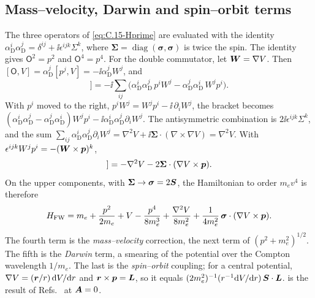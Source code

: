 \subsection{Mass--velocity, Darwin and spin--orbit terms}

The three operators of \cref{eq:C.15-Hprime} are evaluated with the identity $\alpha_{\mathrm{D}}^i\alpha_{\mathrm{D}}^j = \delta^{ij} + \ii\epsilon^{ijk}\Sigma^k$, where $\boldsymbol{\Sigma} = \operatorname{diag}(\boldsymbol{\sigma}, \boldsymbol{\sigma})$ is twice the spin. The identity gives $\mathsf{O}^2 = p^2$ and $\mathsf{O}^4 = p^4$. For the double commutator, let $\bm{W} = \nabla V$. Then $[\mathsf{O}, V] = \alpha_{\mathrm{D}}^j[p^j, V] = -\ii\alpha_{\mathrm{D}}^jW^j$, and
\begin{equation*}
  [\mathsf{O}, [\mathsf{O}, V]] = -\ii\sum_{ij}\bigl(\alpha_{\mathrm{D}}^i\alpha_{\mathrm{D}}^j\,p^iW^j - \alpha_{\mathrm{D}}^j\alpha_{\mathrm{D}}^i\,W^jp^i\bigr) .
\end{equation*}
With $p^i$ moved to the right, $p^iW^j = W^jp^i - \ii\,\partial_iW^j$, the bracket becomes $(\alpha_{\mathrm{D}}^i\alpha_{\mathrm{D}}^j - \alpha_{\mathrm{D}}^j\alpha_{\mathrm{D}}^i)W^jp^i - \ii\alpha_{\mathrm{D}}^i\alpha_{\mathrm{D}}^j\partial_iW^j$. The antisymmetric combination is $2\ii\epsilon^{ijk}\Sigma^k$, and the sum $\sum_{ij}\alpha_{\mathrm{D}}^i\alpha_{\mathrm{D}}^j\partial_iW^j = \nabla^2V + \ii\boldsymbol{\Sigma}\cdot(\nabla\times\nabla V) = \nabla^2V$. With $\epsilon^{ijk}W^jp^i = -(\bm{W}\times\bm{p})^k$,
\begin{equation}
  [\mathsf{O}, [\mathsf{O}, V]] = -\nabla^2V - 2\boldsymbol{\Sigma}\cdot(\nabla V\times\vect{p}) .
  \label{eq:C.15-double}
\end{equation}
On the upper components, with $\boldsymbol{\Sigma} \to \boldsymbol{\sigma} = 2\bm{S}$, the Hamiltonian to order $m_ev^4$ is therefore
\begin{equation}
  H_{\mathrm{FW}} = m_e + \frac{p^2}{2m_e} + V - \frac{p^4}{8m_e^3} + \frac{\nabla^2V}{8m_e^2} + \frac{1}{4m_e^2}\,\boldsymbol{\sigma}\cdot(\nabla V\times\bm{p}) .
  \label{eq:C.15-HFW}
\end{equation}
The fourth term is the \emph{mass--velocity} correction, the next term of $(p^2 + m_e^2)^{1/2}$. The fifth is the \emph{Darwin} term, a smearing of the potential over the Compton wavelength $1/m_e$. The last is the \emph{spin--orbit} coupling; for a central potential, $\nabla V = (\bm{r}/r)\,\mathrm{d} V/\mathrm{d} r$ and $\bm{r}\times\bm{p} = \bm{L}$, so it equals $(2m_e^2)^{-1}(r^{-1}\mathrm{d} V/\mathrm{d} r)\,\bm{S}\cdot\bm{L}$.  is the result of Refs.~\cite{foldy1950dirac,bjorken1964relativistic} at $\bm{A} = 0$.

